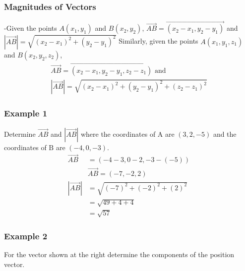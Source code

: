 \documentclass{article}
\begin{document}
\subsubsection{Magnitudes of Vectors}
\begin{tcolorbox}[enhanced,frame style image=blueshade.png,
  opacityback=0.75,opacitybacktitle=0.25,
  colback=blue!5!white,colframe=purple!75!black]
-Given the points $A\left(x_1, y_1\right)$ and $B\left(x_2, y_2\right)$,
$\overrightarrow{A B}=\overrightarrow{\left(x_2-x_1, y_2-y_1\right)}$ and $|\overrightarrow{A B}|=\sqrt{\left(x_2-x_1\right)^2+\left(y_2-y_1\right)^2}$
Similarly, given the points $A\left(x_1, y_1, z_1\right)$ and $B\left(x_2, y_2, z_2\right)$,
$$
\begin{aligned}
\overrightarrow{A B}=\overrightarrow{\left(x_2-x_1, y_2-y_1, z_2-z_1\right)} \text { and } \\
|\overrightarrow{A B}|=\sqrt{\left(x_2-x_1\right)^2+\left(y_2-y_1\right)^2+\left(z_2-z_1\right)^2}
\end{aligned}
$$
\end{tcolorbox}
\subsubsection{Example 1}
Determine $\overrightarrow{A B}$ and $|\overrightarrow{A B}|$ where the coordinates of $\mathrm{A}$ are $(3,2,-5)$ and the coordinates of $\mathrm{B}$ are $(-4,0,-3)$.
\begin{align*}
    \overrightarrow{AB}&=(-4-3,0-2,-3-(-5))\\
    &\boxed{\overrightarrow{AB}=(-7,-2,2)}\\
    |\overrightarrow{AB}| &=\sqrt{(-7)^2+(-2)^2+(2)^2}\\
    &=\sqrt{49+4+4}\\
    &=\sqrt{57}
\end{align*}
\newpage
\subsubsection{Example 2}
For the vector shown at the right determine the components of the position vector. 
\end{document}
